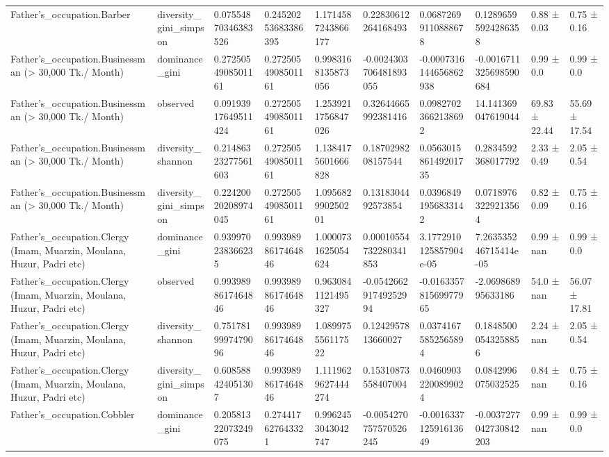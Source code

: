 \begin{longtable}{llllllllll}
Father’s\_occupation.Barber & diversity\_gini\_simpson & 0.07554870346383526 & 0.24520253683386395 & 1.1714587243866177 & 0.22830612264168493 & 0.06872699110888678 & 0.12896595924286358 & 0.88 ± 0.03 & 0.75 ± 0.16 \\
Father’s\_occupation.Businessman (> 30,000 Tk./ Month) & dominance\_gini & 0.2725054908501161 & 0.2725054908501161 & 0.9983168135873056 & -0.0024303706481893055 & -0.0007316144656862938 & -0.0016711325698590684 & 0.99 ± 0.0 & 0.99 ± 0.0 \\
Father’s\_occupation.Businessman (> 30,000 Tk./ Month) & observed & 0.09193917649511424 & 0.2725054908501161 & 1.2539211756847026 & 0.32644665992381416 & 0.09827023662138692 & 14.141369047619044 & 69.83 ± 22.44 & 55.69 ± 17.54 \\
Father’s\_occupation.Businessman (> 30,000 Tk./ Month) & diversity\_shannon & 0.21486323277561603 & 0.2725054908501161 & 1.1384175601666828 & 0.1870298208157544 & 0.056301586149201735 & 0.2834592368017792 & 2.33 ± 0.49 & 2.05 ± 0.54 \\
Father’s\_occupation.Businessman (> 30,000 Tk./ Month) & diversity\_gini\_simpson & 0.22420020208974045 & 0.2725054908501161 & 1.095682990250201 & 0.1318304492573854 & 0.03968491956833142 & 0.07189763229213564 & 0.82 ± 0.09 & 0.75 ± 0.16 \\
Father’s\_occupation.Clergy (Imam, Muarzin, Moulana, Huzur, Padri etc) & dominance\_gini & 0.939970238366235 & 0.9939898617464846 & 1.0000731625054624 & 0.00010554732280341853 & 3.1772910125857904e-05 & 7.263535246715414e-05 & 0.99 ± nan & 0.99 ± 0.0 \\
Father’s\_occupation.Clergy (Imam, Muarzin, Moulana, Huzur, Padri etc) & observed & 0.9939898617464846 & 0.9939898617464846 & 0.9630841121495327 & -0.054266291749252994 & -0.016335781569977965 & -2.069868995633186 & 54.0 ± nan & 56.07 ± 17.81 \\
Father’s\_occupation.Clergy (Imam, Muarzin, Moulana, Huzur, Padri etc) & diversity\_shannon & 0.7517819997479096 & 0.9939898617464846 & 1.089975556117522 & 0.1242957813660027 & 0.03741675852565894 & 0.18485000543258856 & 2.24 ± nan & 2.05 ± 0.54 \\
Father’s\_occupation.Clergy (Imam, Muarzin, Moulana, Huzur, Padri etc) & diversity\_gini\_simpson & 0.608588424051307 & 0.9939898617464846 & 1.1119629627444274 & 0.15310873558407004 & 0.04609032200899024 & 0.0842996075032525 & 0.84 ± nan & 0.75 ± 0.16 \\
Father’s\_occupation.Cobbler & dominance\_gini & 0.20581322073249075 & 0.274417627643321 & 0.9962453043042747 & -0.0054270757570526245 & -0.001633712591613649 & -0.0037277042730842203 & 0.99 ± nan & 0.99 ± 0.0 \\

\end{longtable}
